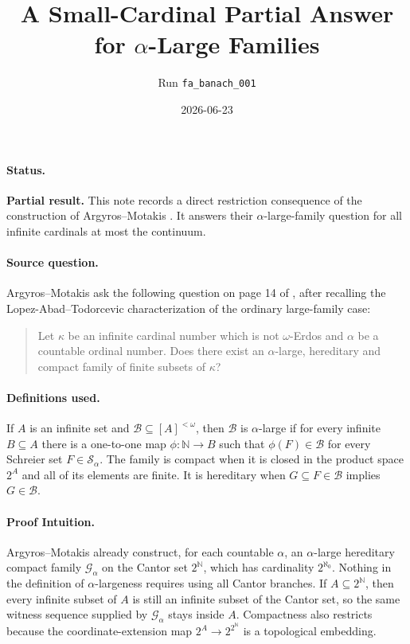 \documentclass[11pt]{article}
\title{A Small-Cardinal Partial Answer for \(\alpha\)-Large Families}
\author{Run \texttt{fa\_banach\_001}}
\date{2026-06-23}
\newcommand{\cont}{2^{\aleph_0}}
\begin{document}
\sloppy
\maketitle

\paragraph{Status.}
\textbf{Partial result.} This note records a direct restriction consequence
of the construction of Argyros--Motakis \cite{AM}. It answers their
\(\alpha\)-large-family question for all infinite cardinals at most the
continuum.

\paragraph{Source question.}
Argyros--Motakis ask the following question on page 14 of
\cite{AM}, after recalling the Lopez-Abad--Todorcevic characterization of
the ordinary large-family case:
\begin{quote}
Let \(\kappa\) be an infinite cardinal number which is not
\(\omega\)-Erdos and \(\alpha\) be a countable ordinal number. Does there
exist an \(\alpha\)-large, hereditary and compact family of finite subsets
of \(\kappa\)?
\end{quote}

\paragraph{Definitions used.}
If \(A\) is an infinite set and \(\mathcal B\subseteq [A]^{<\omega}\), then
\(\mathcal B\) is \(\alpha\)-large if for every infinite \(B\subseteq A\)
there is a one-to-one map \(\phi:\mathbb N\to B\) such that
\(\phi(F)\in \mathcal B\) for every Schreier set \(F\in\mathcal S_\alpha\).
The family is compact when it is closed in the product space \(2^A\) and all
of its elements are finite. It is hereditary when \(G\subseteq F\in\mathcal B\)
implies \(G\in\mathcal B\).

\paragraph{Proof Intuition.}
Argyros--Motakis already construct, for each countable \(\alpha\), an
\(\alpha\)-large hereditary compact family \(\mathcal G_\alpha\) on the
Cantor set \(2^{\mathbb N}\), which has cardinality \(\cont\). Nothing in the
definition of \(\alpha\)-largeness requires using all Cantor branches. If
\(A\subseteq 2^{\mathbb N}\), then every infinite subset of \(A\) is still an
infinite subset of the Cantor set, so the same witness sequence supplied by
\(\mathcal G_\alpha\) stays inside \(A\). Compactness also restricts because
the coordinate-extension map \(2^A\to 2^{2^{\mathbb N}}\) is a topological
embedding.
\end{document}
